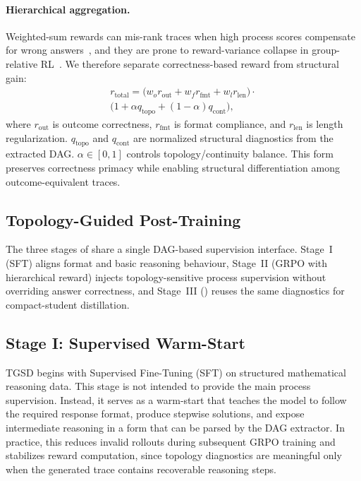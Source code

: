 \paragraph{Hierarchical aggregation.}
Weighted-sum rewards can mis-rank traces when high process scores compensate for wrong answers~\citep{Denison2024SycophancyTS}, and they are prone to reward-variance collapse in group-relative RL~\citep{yu2025dapo,kazemnejad2025vineppo}.
We therefore separate correctness-based reward from structural gain:
\begin{align}
\label{eq:r_total}
r_{\mathrm{total}} =
\bigl(w_o r_{\mathrm{out}} + w_f r_{\mathrm{fmt}} + w_l r_{\mathrm{len}}\bigr)
\cdot \\
\bigl(1 + \alpha q_{\mathrm{topo}} + (1-\alpha) q_{\mathrm{cont}}\bigr),
\end{align}
where $r_{\mathrm{out}}$ is outcome correctness, $r_{\mathrm{fmt}}$ is format compliance, and $r_{\mathrm{len}}$ is length regularization.
$q_{\mathrm{topo}}$ and $q_{\mathrm{cont}}$ are normalized structural diagnostics from the extracted DAG.
$\alpha\in[0,1]$ controls topology/continuity balance.
This form preserves correctness primacy while enabling structural differentiation among outcome-equivalent traces.

\subsection{Topology-Guided Post-Training}
\label{sec:post_training}
The three stages of \framework share a single DAG-based supervision interface.
Stage~I (SFT) aligns format and basic reasoning behaviour, Stage~II (GRPO with hierarchical reward) injects topology-sensitive process supervision without overriding answer correctness, and Stage~III (\framework) reuses the same diagnostics for compact-student distillation.

\subsection{Stage I: Supervised Warm-Start}

TGSD begins with Supervised Fine-Tuning (SFT) on structured mathematical reasoning data. This stage is not intended to provide the main process supervision. Instead, it serves as a warm-start that teaches the model to follow the required response format, produce stepwise solutions, and expose intermediate reasoning in a form that can be parsed by the DAG extractor. In practice, this reduces invalid rollouts during subsequent GRPO training and stabilizes reward computation, since topology diagnostics are meaningful only when the generated trace contains recoverable reasoning steps.

